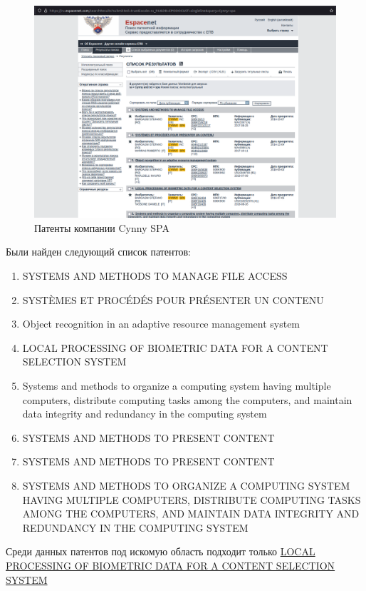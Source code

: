 \documentclass[12pt]{article}
\begin{document}
    \begin{figure}[ht]
        \centering
        \includegraphics[scale=1.5]{images/3.png}
        \caption{Патенты компании Cynny SPA}
        \label{fig:o:3}
    \end{figure}

    Были найден следующий список патентов:

    \begin{enumerate}
        \item SYSTEMS AND METHODS TO MANAGE FILE ACCESS
        \item SYSTÈMES ET PROCÉDÉS POUR PRÉSENTER UN CONTENU
        \item Object recognition in an adaptive resource management system
        \item LOCAL PROCESSING OF BIOMETRIC DATA FOR A CONTENT SELECTION SYSTEM
        \item Systems and methods to organize a computing system having multiple computers, distribute computing tasks among the computers, and maintain data integrity and redundancy in the computing system
        \item SYSTEMS AND METHODS TO PRESENT CONTENT
        \item SYSTEMS AND METHODS TO PRESENT CONTENT
        \item SYSTEMS AND METHODS TO ORGANIZE A COMPUTING SYSTEM HAVING MULTIPLE COMPUTERS, DISTRIBUTE COMPUTING TASKS AMONG THE COMPUTERS, AND MAINTAIN DATA INTEGRITY AND REDUNDANCY IN THE COMPUTING SYSTEM
    \end{enumerate}

    Среди данных патентов под искомую область подходит только \href{https://ru.espacenet.com/publicationDetails/biblio?DB=EPODOC&II=3&ND=3&adjacent=true&locale=ru_RU&FT=D&date=20180816&CC=US&NR=2018232370A1&KC=A1#}{LOCAL PROCESSING OF BIOMETRIC DATA FOR A CONTENT SELECTION SYSTEM}
\end{document}
